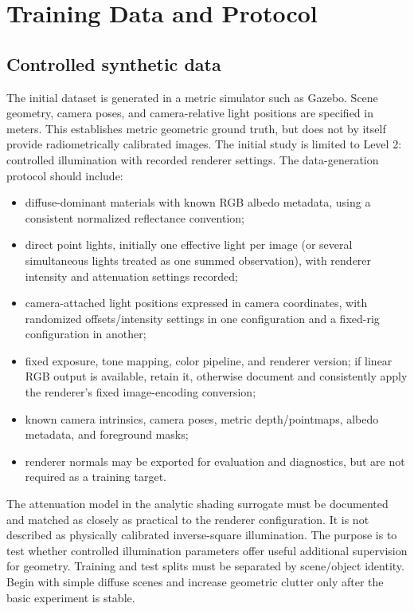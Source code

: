 \documentclass[11pt,a4paper]{article}
\begin{document}
\section{Training Data and Protocol}

\subsection{Controlled synthetic data}

The initial dataset is generated in a metric simulator such as Gazebo. Scene
geometry, camera poses, and camera-relative light positions are specified
in meters. This establishes metric geometric ground truth, but does not by
itself provide radiometrically calibrated images. The initial study is
limited to Level 2: controlled illumination with recorded renderer settings.
The data-generation protocol should include:
\begin{itemize}
  \item diffuse-dominant materials with known RGB albedo metadata, using a
  consistent normalized reflectance convention;
  \item direct point lights, initially one effective light per image (or
  several simultaneous lights treated as one summed observation), with
  renderer intensity and attenuation settings recorded;
  \item camera-attached light positions expressed in camera coordinates,
  with randomized offsets/intensity settings in one configuration and a
  fixed-rig configuration in another;
  \item fixed exposure, tone mapping, color pipeline, and renderer version;
  if linear RGB output is available, retain it, otherwise document and
  consistently apply the renderer's fixed image-encoding conversion;
  \item known camera intrinsics, camera poses, metric depth/pointmaps,
  albedo metadata, and foreground masks;
  \item renderer normals may be exported for evaluation and diagnostics,
  but are not required as a training target.
\end{itemize}
The attenuation model in the analytic shading surrogate must be documented
and matched as closely as practical to the renderer configuration. It is
not described as physically calibrated inverse-square illumination. The
purpose is to test whether controlled illumination parameters offer
useful additional supervision for geometry. Training and test splits must
be separated by scene/object identity. Begin with simple diffuse scenes and
increase geometric clutter only after the basic experiment is stable.
\end{document}
